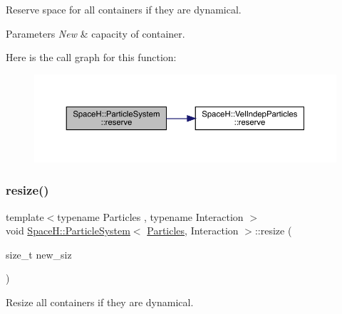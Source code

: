 Reserve space for all containers if they are dynamical. 


\begin{DoxyParams}{Parameters}
{\em New} & capacity of container. \\
\hline
\end{DoxyParams}
Here is the call graph for this function\+:
\nopagebreak
\begin{figure}[H]
\begin{center}
\leavevmode
\includegraphics[width=350pt]{class_space_h_1_1_particle_system_a8c62e209b283261d3e616ff23eddd748_cgraph}
\end{center}
\end{figure}
\mbox{\label{class_space_h_1_1_particle_system_af485828ec5712726054b377e9c135d39}} 
\subsubsection{\texorpdfstring{resize()}{resize()}}
{\footnotesize\ttfamily template$<$typename Particles , typename Interaction $>$ \\
void \mbox{\hyperlink{class_space_h_1_1_particle_system}{Space\+H\+::\+Particle\+System}}$<$ \mbox{\hyperlink{struct_space_h_1_1_particles}{Particles}}, Interaction $>$\+::resize (\begin{DoxyParamCaption}\item[{size\+\_\+t}]{new\+\_\+siz }\end{DoxyParamCaption})\hspace{0.3cm}{\ttfamily [inline]}}



Resize all containers if they are dynamical. 


